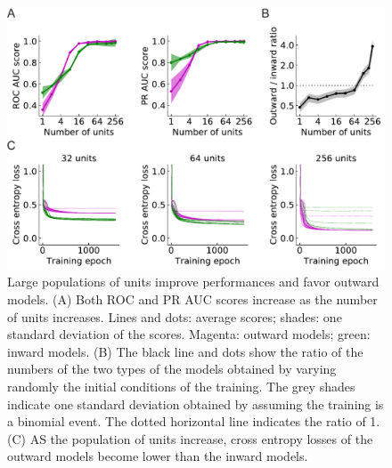 \documentclass[pdftex,9pt,lineno]{elife}
\begin{document}
\begin{figure}
\includegraphics[width=\linewidth]{figures/outward_better_than_inward_paper.pdf}
\caption{Large populations of units improve performances and favor outward models. (A) Both ROC and PR AUC scores increase as the number of units increases. Lines and dots: average scores; shades: one standard deviation of the scores. Magenta: outward models; green: inward models. (B) The black line and dots show the ratio of the numbers of the two types of the models obtained by varying randomly the initial conditions of the training. The grey shades indicate one standard deviation obtained by assuming the training is a binomial event. The dotted horizontal line indicates the ratio of 1. (C) AS the population of units increase, cross entropy losses of the outward models become lower than the inward models.}
\label{fig:outward_prevail}

\end{figure}
\end{document}
